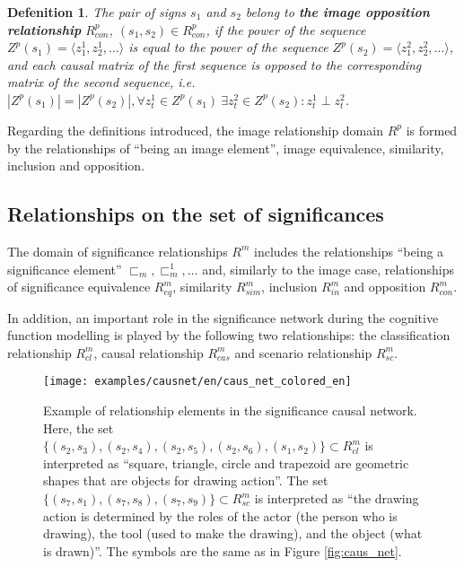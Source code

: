 \documentclass[12pt]{scrartcl}
\newtheorem{definition}{Defenition}
\begin{document}
	\begin{definition}
		The pair of signs $s_1$ and $s_2$ belong to \textbf{the image opposition relationship} $R_{con}^p$, $(s_1,s_2)\in R_{con}^p$, if the power of the sequence $Z^p(s_1)=\langle z_1^1,z_2^1,\dots\rangle$ is equal to the power of the sequence $Z^p(s_2)=\langle z_1^2,z_2^2,\dots\rangle$, and each causal matrix of the first sequence is opposed to the corresponding matrix of the second sequence, i.e. $|Z^p(s_1)| = |Z^p(s_2)|, \forall z_t^1\in Z^p(s_1)\ \exists z_t^2\in Z^p(s_2): z_t^1\perp z_t^2$.
	\end{definition}
	
	Regarding the definitions introduced, the image relationship domain $R^p$ is formed by the relationships of ``being an image element'', image equivalence, similarity, inclusion and opposition.
			
	\subsection{Relationships on the set of significances}	
	
	The domain of significance relationships $R^m$ includes the relationships ``being a significance element'' ${\sqsubset_m,\sqsubset_m^1,\dots}$ and, similarly to the image case, relationships of significance equivalence $R_{eq}^m$, similarity $R_{sim}^m$, inclusion $R_{in}^m$ and opposition $R_{con}^m$.
	
	In addition, an important role in the significance network during the cognitive function modelling is played by the following two relationships: the classification relationship $R_{cl}^m$, causal relationship $R_{cas}^m$ and scenario relationship $R_{sc}^m$.
	
	\begin{figure}[H]
		\centering
		\texttt{[image: examples/causnet/en/caus\_net\_colored\_en]}
		\caption{Example of relationship elements in the significance causal network. Here, the set $\{(s_2,s_3),(s_2,s_4),(s_2,s_5),(s_2,s_6),(s_1,s_2)\}\subset R_{cl}^m$ is interpreted as ``square, triangle, circle and trapezoid are geometric shapes that are objects for drawing action''. The set $\{(s_7,s_1),(s_7,s_8),(s_7,s_9)\}\subset R_{sc}^m$ is interpreted as ``the drawing action is determined by the roles of the actor (the person who is drawing), the tool (used to make the drawing), and the object (what is drawn)''. The symbols are the same as in Figure \ref{fig:caus_net}.}
		\label{fig:signif_relat}		
	\end{figure}
	
\end{document}

